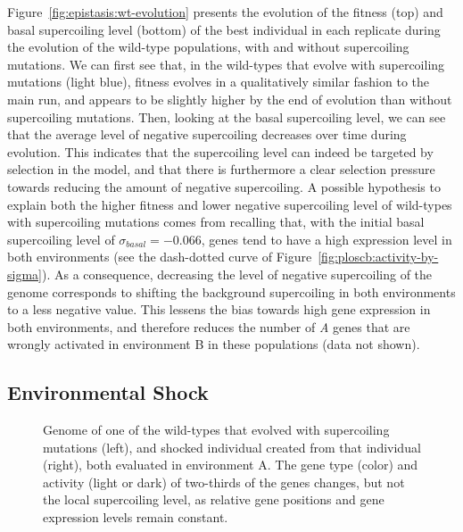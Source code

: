 Figure~\ref{fig:epistasis:wt-evolution} presents the evolution of the fitness (top) and basal supercoiling level (bottom) of the best individual in each replicate during the evolution of the wild-type populations, with and without supercoiling mutations.
We can first see that, in the wild-types that evolve with supercoiling mutations (light blue), fitness evolves in a qualitatively similar fashion to the main run, and appears to be slightly higher by the end of evolution than without supercoiling mutations.
Then, looking at the basal supercoiling level, we can see that the average level of negative supercoiling decreases over time during evolution.
This indicates that the supercoiling level can indeed be targeted by selection in the model, and that there is furthermore a clear selection pressure towards reducing the amount of negative supercoiling.
A possible hypothesis to explain both the higher fitness and lower negative supercoiling level of wild-types with supercoiling mutations comes from recalling that, with the initial basal supercoiling level of $\sigma_{basal} = -0.066$, genes tend to have a high expression level in both environments (see the dash-dotted curve of Figure~\ref{fig:ploscb:activity-by-sigma}).
As a consequence, decreasing the level of negative supercoiling of the genome corresponds to shifting the background supercoiling in both environments to a less negative value.
This lessens the bias towards high gene expression in both environments, and therefore reduces the number of \emph{A} genes that are wrongly activated in environment B in these populations (data not shown).

\subsection{Environmental Shock}

\begin{figure}
\centering
\begin{elasticrow}[width=\textwidth]
\end{elasticrow}
\caption[Evolved wild-type individual before and after an environmental shock]{Genome of one of the wild-types that evolved with supercoiling mutations (left), and shocked individual created from that individual (right), both evaluated in environment A.
The gene type (color) and activity (light or dark) of two-thirds of the genes changes, but not the local supercoiling level, as relative gene positions and gene expression levels remain constant.}
\label{fig:epistasis:shock}
\end{figure}

